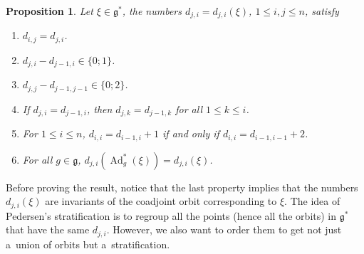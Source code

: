 \documentclass[pdftex]{sigma}
\newcommand{\Ad}{\operatorname{Ad}} %
\newcommand{\g}{\mathfrak{g}} %
\numberwithin{equation}{section}
\newtheorem{prop}[thm]{Proposition}
\theoremstyle{definition}
\begin{document}
\begin{prop}
 Let $\xi \in \g^*$, the numbers $d_{j,i} = d_{j,i}(\xi)$, $1\leq i,j\leq n$, satisfy
 \begin{enumerate}\itemsep=0pt
 \item[$(1)$] $d_{i,j} = d_{j,i}$.
 \item[$(2)$] $d_{j,i} - d_{j-1,i} \in \{0;1\}$.
 \item[$(3)$] $d_{j,j} - d_{j-1,j-1} \in \{0;2\}$.
 \item[$(4)$] If $d_{j,i} = d_{j-1,i}$, then $d_{j,k} = d_{j-1,k}$ for all $1\leq k \leq i$.
 \item[$(5)$] For $1\leq i \leq n$, $d_{i,i} = d_{i-1,i}+1$ if and only if $d_{i,i} = d_{i-1,i-1}+2$.
 \item[$(6)$] For all $g \in \g$, $d_{j,i}(\Ad^*_g(\xi)) = d_{j,i}(\xi)$.
 \end{enumerate}
\end{prop}

Before proving the result, notice that the last property implies that the numbers $d_{j,i}(\xi)$ are invariants of the coadjoint orbit corresponding to $\xi$. The idea of Pedersen's stratification is to regroup all the points (hence all the orbits) in $\g^*$ that have the same $d_{j,i}$. However, we also want to order them to get not just a~union of orbits but a~stratification.
\end{document}
